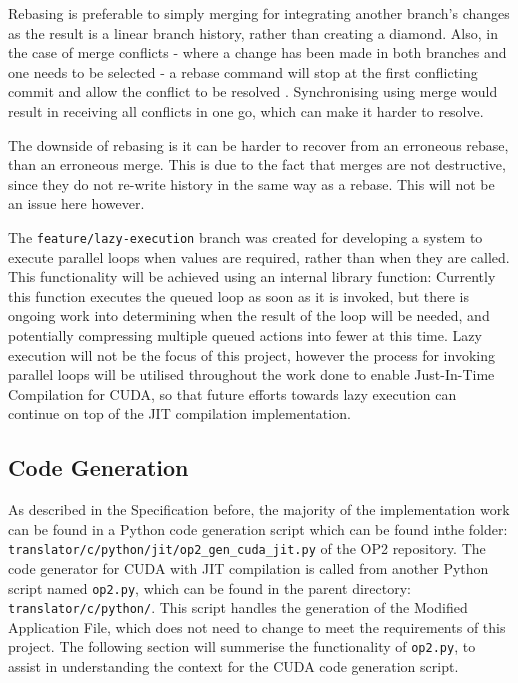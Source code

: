 \par
Rebasing is preferable to simply merging for integrating another branch's changes as the result is a linear branch history, rather than creating a diamond. Also, in the case of merge conflicts - where a change has been made in both branches and one needs to be selected - a rebase command will stop at the first conflicting commit and allow the conflict to be resolved \cite{rebase-doc}. Synchronising using merge would result in receiving all conflicts in one go, which can make it harder to resolve.
\par
The downside of rebasing is it can be harder to recover from an erroneous rebase, than an erroneous merge. This is due to the fact that merges are not destructive, since they do not re-write history in the same way as a rebase. This will not be an issue here however.
\par
The \verb|feature/lazy-execution| branch was created for developing a system to execute parallel loops when values are required, rather than when they are called. This functionality will be achieved using an internal library function:
Currently this function executes the queued loop as soon as it is invoked, but there is ongoing work into determining when the result of the loop will be needed, and potentially compressing multiple queued actions into fewer at this time. Lazy execution will not be the focus of this project, however the process for invoking parallel loops will be utilised throughout the work done to enable Just-In-Time Compilation for CUDA, so that future efforts towards lazy execution can continue on top of the JIT compilation implementation.

\subsection{Code Generation}
\label{ss:codegen}
As described in the Specification before, the majority of the implementation work can be found in a Python code generation script which can be found inthe folder: \verb|translator/c/python/jit/op2_gen_cuda_jit.py| of the OP2 repository.
\noindent The code generator for CUDA with JIT compilation is called from another Python script named \verb|op2.py|, which can be found in the parent directory: \verb|translator/c/python/|. This script handles the generation of the Modified Application File, which does not need to change to meet the requirements of this project. The following section will summerise the functionality of \verb|op2.py|, to assist in understanding the context for the CUDA code generation script.

